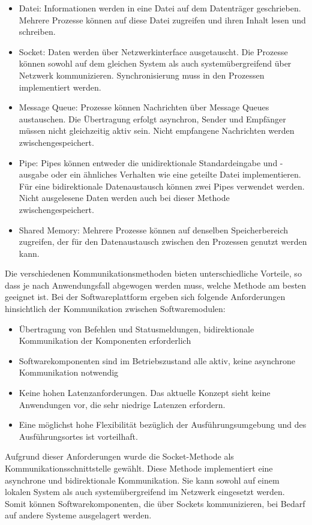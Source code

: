 \begin{itemize}
    \item Datei: Informationen werden in eine Datei auf dem Datenträger geschrieben. Mehrere Prozesse können auf diese Datei zugreifen und ihren Inhalt lesen und schreiben.
    \item Socket: Daten werden über Netzwerkinterface ausgetauscht. Die Prozesse können sowohl auf dem gleichen System als auch systemübergreifend über Netzwerk kommunizieren. Synchronisierung muss in den Prozessen implementiert werden.
    \item Message Queue: Prozesse können Nachrichten über Message Queues austauschen. Die Übertragung erfolgt asynchron, Sender und Empfänger müssen nicht gleichzeitig aktiv sein. Nicht empfangene Nachrichten werden zwischengespeichert. 
    \item Pipe: Pipes können entweder die unidirektionale Standardeingabe und -ausgabe oder ein ähnliches Verhalten wie eine geteilte Datei implementieren. Für eine bidirektionale Datenaustausch können zwei Pipes verwendet werden. Nicht ausgelesene Daten werden auch bei dieser Methode zwischengespeichert. 
    \item Shared Memory: Mehrere Prozesse können auf denselben Speicherbereich zugreifen, der für den Datenaustausch zwischen den Prozessen genutzt werden kann.
\end{itemize}

Die verschiedenen Kommunikationsmethoden bieten unterschiedliche Vorteile, so dass je nach Anwendungsfall abgewogen werden muss, welche Methode am besten geeignet ist. Bei der Softwareplattform ergeben sich folgende Anforderungen hinsichtlich der Kommunikation zwischen Softwaremodulen:

\begin{itemize}
    \item Übertragung von Befehlen und Statusmeldungen, bidirektionale Kommunikation der Komponenten erforderlich
    \item Softwarekomponenten sind im Betriebszustand alle aktiv, keine asynchrone Kommunikation notwendig
    \item Keine hohen Latenzanforderungen. Das aktuelle Konzept sieht keine Anwendungen vor, die sehr niedrige Latenzen erfordern.
    \item Eine möglichst hohe Flexibilität bezüglich der Ausführungsumgebung und des Ausführungsortes ist vorteilhaft.
\end{itemize}

Aufgrund dieser Anforderungen wurde die Socket-Methode als Kommunikationsschnittstelle gewählt. Diese Methode implementiert eine asynchrone und bidirektionale Kommunikation. Sie kann sowohl auf einem lokalen System als auch systemübergreifend im Netzwerk eingesetzt werden. Somit können Softwarekomponenten, die über Sockets kommunizieren, bei Bedarf auf andere Systeme ausgelagert werden. 

